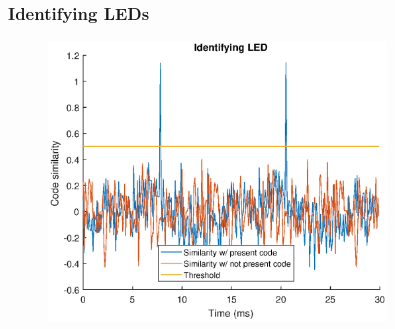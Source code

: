 \documentclass{beamer}
\begin{document}




	\begin{frame}\frametitle{Identifying LEDs}

		\begin{figure}
			\centering
			\includegraphics[width=0.8\textwidth]{correlation-results.eps}
		\end{figure}

	\end{frame}
\end{document}
